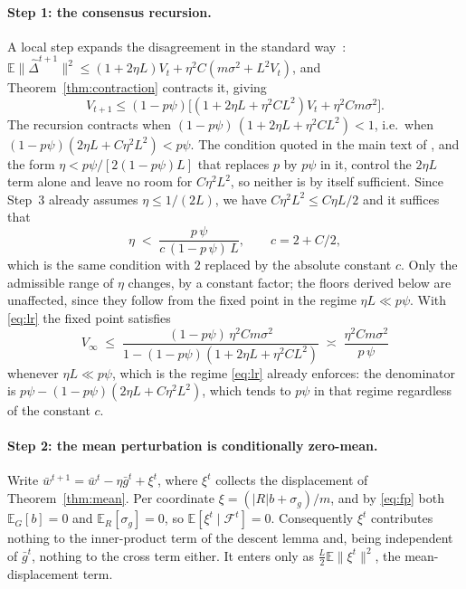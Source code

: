 \documentclass{article}
\theoremstyle{plain}
\newcommand{\sg}{\sigma_g}
\newcommand{\E}{\mathbb{E}}
\begin{document}
\paragraph{Step 1: the consensus recursion.} A local step expands the
disagreement in the standard way~\citep{yu2019linear}:
$\E\|\hat\Delta^{t+1}\|^2 \le (1+2\eta L)V_t + \eta^2C(m\sigma^2 + L^2V_t)$,
and Theorem~\ref{thm:contraction} contracts it, giving
\[
V_{t+1} \le (1-p\psi)\big[(1+2\eta L+\eta^2CL^2)V_t + \eta^2Cm\sigma^2\big].
\]
The recursion contracts when $(1-p\psi)\,(1+2\eta L+\eta^2CL^2) < 1$, i.e.\ when
$(1-p\psi)(2\eta L + C\eta^2L^2) < p\psi$. The condition quoted in the main text
of \citet{ajanthan2026asyncmesh}, and the form $\eta < p\psi/[2(1-p\psi)L]$ that
replaces $p$ by $p\psi$ in it, control the $2\eta L$ term alone and leave no
room for $C\eta^2L^2$, so neither is by itself sufficient. Since Step~3 already
assumes $\eta \le 1/(2L)$, we have $C\eta^2L^2 \le C\eta L/2$ and it suffices
that
\begin{equation}\label{eq:lr}
\eta \;<\; \frac{p\,\psi}{c\,(1-p\,\psi)\,L},
\qquad c = 2 + C/2 ,
\end{equation}
which is the same condition with $2$ replaced by the absolute constant $c$.
Only the admissible range of $\eta$ changes, by a constant factor; the floors
derived below are unaffected, since they follow from the fixed point in the
regime $\eta L \ll p\psi$. With \eqref{eq:lr} the fixed point satisfies
\begin{equation}\label{eq:vinf}
V_\infty \;\le\; \frac{(1-p\psi)\,\eta^2Cm\sigma^2}{1-(1-p\psi)(1+2\eta L+\eta^2CL^2)}
\;\asymp\; \frac{\eta^2Cm\sigma^2}{p\,\psi}
\end{equation}
whenever $\eta L \ll p\psi$, which is the regime \eqref{eq:lr} already
enforces: the denominator is $p\psi - (1-p\psi)(2\eta L + C\eta^2L^2)$, which
tends to $p\psi$ in that regime regardless of the constant $c$.

\paragraph{Step 2: the mean perturbation is conditionally zero-mean.} Write
$\bar w^{t+1} = \bar w^t - \eta\bar g^t + \xi^t$, where $\xi^t$ collects the
displacement of Theorem~\ref{thm:mean}. Per coordinate
$\xi = (|R|b+\sg)/m$, and by \eqref{eq:fp} both $\E_G[b] = 0$ and
$\E_R[\sg] = 0$, so $\E[\xi^t\mid\mathcal{F}^t] = 0$. Consequently $\xi^t$
contributes nothing to the inner-product term of the descent lemma and, being
independent of $\bar g^t$, nothing to the cross term either. It
enters only as $\frac{L}{2}\E\|\xi^t\|^2$, the mean-displacement term.
\end{document}
